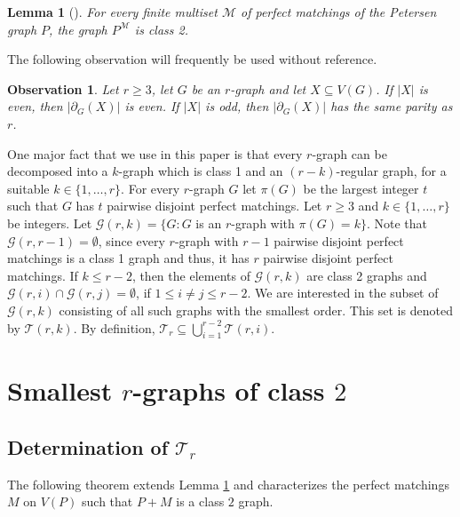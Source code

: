 \documentclass[a4paper,11pt]{article}
\newcommand{\ca}{\mathcal}
\newtheorem{lem}[defi]{Lemma}
\newtheorem{obs}[defi]{Observation}
\theoremstyle{remark}
\begin{document}
\begin{lem} [\cite{Grunewald_Steffen_1999}] \label{lem: P^M class 2}
For every finite multiset $\ca M$ of perfect matchings of the Petersen graph $P$,
the graph $P^{\ca M}$ is class 2.
\end{lem}

The following observation  will  frequently   be used without reference.

\begin{obs}\label{Observation-same-parity}
Let $r\geq 3$, let $G$ be an $r$-graph and let $X \subseteq V(G)$. If $\vert X \vert$ is even, then $\vert \partial_G(X) \vert$ is even. If $\vert X \vert$ is odd, then $\vert \partial_G(X) \vert$ has the same parity as $r$.
\end{obs}

One major fact that we use in this paper is that every $r$-graph can be
decomposed into a $k$-graph which is class 1 and an $(r-k)$-regular graph, for a suitable $k \in \{1, \dots ,r\}$. 
For every $r$-graph $G$ let $\pi(G)$ be the largest integer $t$ such that $G$ has $t$ pairwise disjoint perfect matchings.
Let $r\ge3$ and $k\in \{1,\dots, r\}$ be integers. Let 
$\ca G(r,k)=\{G\colon G$ is an $r$-graph with $\pi(G)=k \}$. 
Note that $\ca G(r,r-1) = \emptyset$, since
every $r$-graph with $r-1$ pairwise disjoint perfect matchings is a class 1 graph
and thus, it has $r$ pairwise disjoint perfect matchings. If $ k \leq r-2$, then the elements
of $\ca G(r,k)$ are class 2 graphs and $\ca G(r,i) \cap \ca G(r,j) = \emptyset$, if $1 \leq i \not = j \leq r-2$. We are interested in 
 the subset of $\ca G(r,k)$ consisting of all such graphs with the smallest order.
 This set is denoted by $\ca T(r,k)$.
 By definition, $\ca T_r \subseteq \bigcup_{i=1}^{r-2} \ca T(r,i)$.

\section{Smallest $r$-graphs of class $2$} \label{Sec: smallest r-graphs}

\subsection{Determination of $\ca T_r$} 




The following theorem extends Lemma \ref{lem: P^M class 2} and characterizes the perfect matchings $M$ on $V(P)$ such that $P+M$ is a class $2$ graph.
\end{document}

